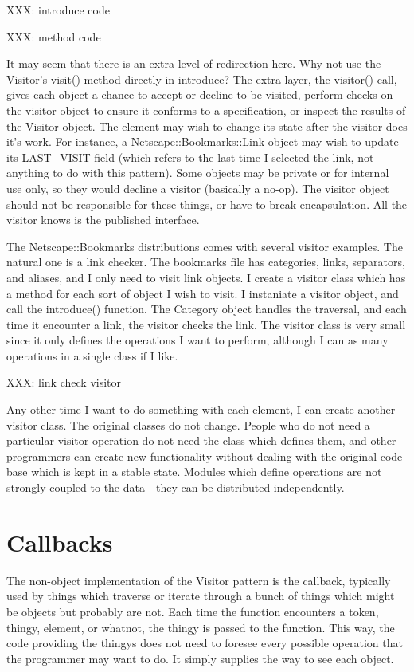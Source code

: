 XXX: introduce code

XXX: method code



It may seem that there is an extra level of redirection
here. Why not use the Visitor's visit() method directly in
introduce? The extra layer, the visitor() call, gives each
object a chance to accept or decline to be visited, perform
checks on the visitor object to ensure it conforms to a
specification, or inspect the results of the Visitor object.
 The element may wish to change its state after the visitor
does it's work.  For instance, a Netscape::Bookmarks::Link
object may wish to update its LAST\_VISIT field (which
refers to the last time I selected the link, not anything to
do with this pattern). Some objects may be private or for
internal use only, so they would decline a visitor
(basically a no-op). The visitor object should not be
responsible for these things, or have to break
encapsulation. All the visitor knows is the published
interface.

The Netscape::Bookmarks distributions comes with several
visitor examples.  The natural one is a link checker.  The
bookmarks file has categories, links, separators, and
aliases, and I only need to visit link objects.  I create a
visitor class which has a method for each sort of object I
wish to visit.  I instaniate a visitor object, and call the
introduce() function.  The Category object handles the
traversal, and each time it encounter a link, the visitor
checks the link.  The visitor class is very small since it
only defines the operations I want to perform, although I
can as many operations in a single class if I like.

XXX: link check visitor

Any other time I want to do something with each element, I
can create another visitor class.  The original classes do
not change.  People who do not need a particular visitor
operation do not need the class which defines them, and
other programmers can create new functionality without
dealing with the original code base which is kept in a
stable state.  Modules which define operations are not
strongly coupled to the data---they can be distributed
independently.

	\section{Callbacks}
	
The non-object implementation of the Visitor pattern is the
callback, typically used by things which traverse or iterate
through a bunch of things which might be objects but
probably are not.  Each time the function encounters a token,
thingy, element, or whatnot, the thingy is passed to the
function.  This way, the code providing the thingys does not
need to foresee every possible operation that the programmer
may want to do.  It simply supplies the way to see each
object.

